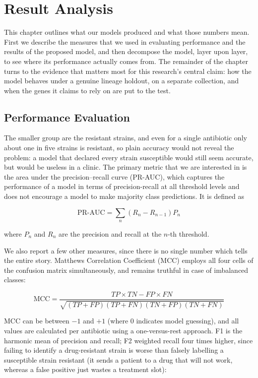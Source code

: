 

\chapter{Result Analysis}
\label{ch:results}

This chapter outlines what our models produced and what those numbers mean. First
we describe the measures that we used in evaluating performance and the results
of the proposed model, and then decompose the model, layer upon layer, to see
where its performance actually comes from. The remainder of the chapter
turns to the evidence that matters most for this research's central claim: how
the model behaves under a genuine lineage holdout, on a separate collection,
and when the genes it claims to rely on are put to the test.

\section{Performance Evaluation}
\label{sec:perfeval}

The smaller group are the resistant strains, and
even for a single antibiotic only about one in five strains is resistant, so plain
accuracy would not reveal the problem: a model that declared every strain susceptible
would still seem accurate, but would be useless in a clinic. The primary
metric that we are interested in is the area under the precision--recall curve
(PR-AUC), which captures the performance of a model in terms of
precision-recall at all threshold levels and does not encourage a model to
make majority class predictions. It is defined as

\begin{equation}
\text{PR-AUC} = \sum_{n} \left( R_n - R_{n-1} \right) P_n
\end{equation}

where $P_n$ and $R_n$ are the precision and recall at the $n$-th threshold.

We also report a few other measures, since there is no single number which
tells the entire story. Matthews Correlation Coefficient (MCC) employs all
four cells of the confusion matrix simultaneously, and remains truthful in
case of imbalanced classes:

\begin{equation}
\text{MCC} = \frac{TP \times TN - FP \times FN}
{\sqrt{(TP+FP)(TP+FN)(TN+FP)(TN+FN)}}
\end{equation}

MCC can be between $-1$ and $+1$ (where $0$ indicates model guessing), and all
values are calculated per antibiotic using a one-versus-rest approach. F1 is
the harmonic mean of precision and recall; F2 weighted recall four times
higher, since failing to identify a drug-resistant strain is worse than
falsely labelling a susceptible strain resistant (it sends a patient to a drug that will not
work, whereas a false positive just wastes a treatment slot):

